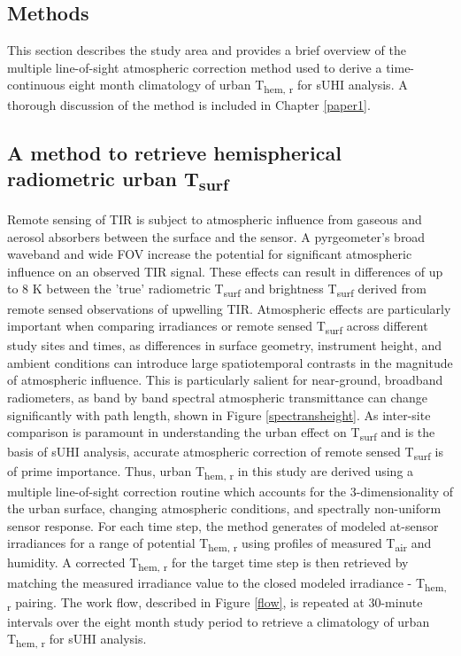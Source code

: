 \begin{bibunit}
\section{Methods}

This section describes the study area and provides a brief overview of the multiple line-of-sight atmospheric correction method used to derive a time-continuous eight month climatology of urban T\textsubscript{hem, r} for sUHI analysis. A thorough discussion of the method is included in Chapter \ref{paper1}.

\subsection{A method to retrieve hemispherical radiometric urban T\textsubscript{surf}}
\label{method2}

Remote sensing of TIR is subject to atmospheric influence from gaseous and aerosol absorbers between the surface and the sensor. A pyrgeometer's broad waveband and wide FOV increase the potential for significant atmospheric influence on an observed TIR signal. These effects can result in differences of up to 8 \si{\kelvin} between the 'true' radiometric T\textsubscript{surf} and brightness T\textsubscript{surf} derived from remote sensed observations of upwelling TIR. Atmospheric effects are particularly important when comparing irradiances or remote sensed T\textsubscript{surf} across different study sites and times, as differences in surface geometry, instrument height, and ambient conditions can introduce large spatiotemporal contrasts in the magnitude of atmospheric influence. This is particularly salient for near-ground, broadband radiometers, as band by band spectral atmospheric transmittance can change significantly with path length, shown in Figure \ref{spectransheight}. As inter-site comparison is paramount in understanding the urban effect on T\textsubscript{surf} and is the basis of sUHI analysis, accurate atmospheric correction of remote sensed T\textsubscript{surf} is of prime importance. Thus, urban T\textsubscript{hem, r} in this study are derived using a multiple line-of-sight correction routine which accounts for the 3-dimensionality of the urban surface, changing atmospheric conditions, and spectrally non-uniform sensor response. For each time step, the method generates of modeled at-sensor irradiances for a range of potential T\textsubscript{hem, r} using profiles of measured T\textsubscript{air} and humidity. A corrected T\textsubscript{hem, r} for the target time step is then retrieved by matching the measured irradiance value to the closed modeled irradiance - T\textsubscript{hem, r} pairing. The work flow, described in Figure \ref{flow}, is repeated at 30-minute intervals over the eight month study period to retrieve a climatology of urban T\textsubscript{hem, r} for sUHI analysis.


\end{bibunit}
